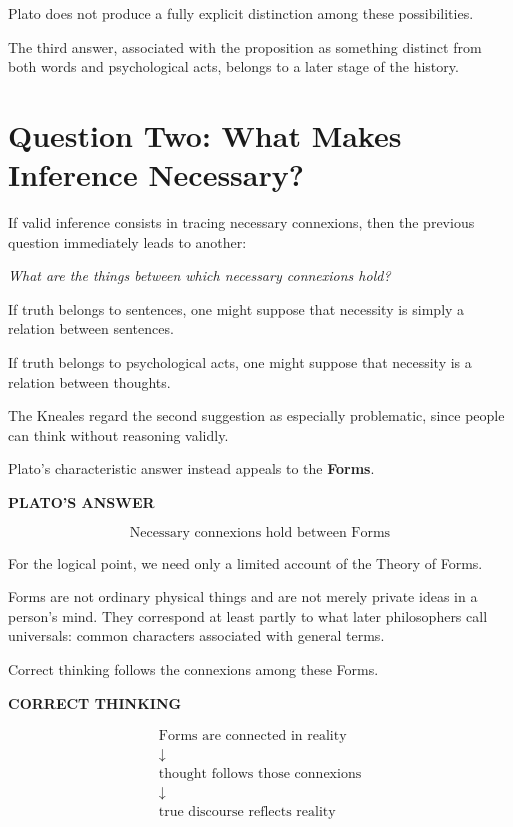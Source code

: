 \documentclass[11pt]{article}
\begin{document}
Plato does not produce a fully explicit distinction among these
possibilities.

The third answer, associated with the proposition as something
distinct from both words and psychological acts, belongs to a
later stage of the history.

\section{Question Two: What Makes Inference Necessary?}

If valid inference consists in tracing necessary connexions, then
the previous question immediately leads to another:

\begin{center}
\emph{What are the things between which necessary connexions
hold?}
\end{center}

If truth belongs to sentences, one might suppose that necessity
is simply a relation between sentences.

If truth belongs to psychological acts, one might suppose that
necessity is a relation between thoughts.

The Kneales regard the second suggestion as especially
problematic, since people can think without reasoning validly.

Plato's characteristic answer instead appeals to the
\textbf{Forms}.

\begin{whiteboard}
\textbf{PLATO'S ANSWER}

\[
\boxed{
\text{Necessary connexions hold between Forms}
}
\]
\end{whiteboard}

For the logical point, we need only a limited account of the
Theory of Forms.

Forms are not ordinary physical things and are not merely private
ideas in a person's mind. They correspond at least partly to what
later philosophers call universals: common characters associated
with general terms.

Correct thinking follows the connexions among these Forms.

\begin{whiteboard}
\textbf{CORRECT THINKING}

\[
\begin{array}{c}
\text{Forms are connected in reality}\\
\downarrow\\
\text{thought follows those connexions}\\
\downarrow\\
\text{true discourse reflects reality}
\end{array}
\]
\end{whiteboard}
\end{document}
